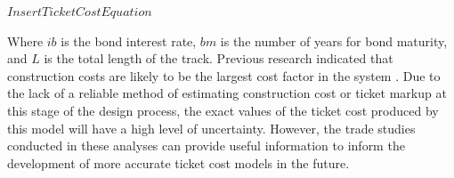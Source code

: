 $Insert Ticket Cost Equation$

Where $ib$ is the bond interest rate, $bm$ is the number of years for bond maturity, and $L$ is the total length of the track. Previous research indicated that construction costs are likely to be the largest cost factor in the system \cite{Musk}. Due to the lack of a reliable method of estimating construction cost or ticket markup at this stage of the design process, the exact values of the ticket cost produced by this model will have a high level of uncertainty. However, the trade studies conducted in these analyses can provide useful information to inform the development of more accurate ticket cost models in the future.